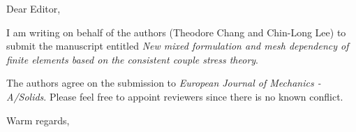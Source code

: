 \documentclass[a4paper,11pt]{letter}
\begin{document}
\onehalfspacing
\begin{letter}{}
\address{E329, Civil/Mech Building\\University of Canterbury\\Christchurch, 8041, NZ}

\opening{Dear Editor,}

I am writing on behalf of the authors (Theodore Chang and Chin-Long Lee) to submit the manuscript entitled \textit{New mixed formulation and mesh dependency of finite elements based on the consistent couple stress theory}.

The authors agree on the submission to \textit{European Journal of Mechanics - A/Solids}. Please feel free to appoint reviewers since there is no known conflict.

\signature{Theodore Chang}

\closing{Warm regards,}
\end{letter}
\clearpage
\end{document}

